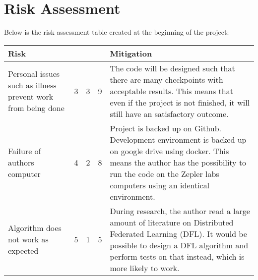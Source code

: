 \section{Risk Assessment}
Below is the risk assessment table created at the beginning of the project:
\begin{table}[H]
	\begin{tabular}{p{4cm}|l|l|l|p{10cm}}
		Risk    & \rotatebox{90}{Severity}  & \rotatebox{90}{Likelihood} & \rotatebox{90}{Score} & Mitigation \\
		\hline \hline
		Personal issues such as illness prevent work from being done & 3        & 3          & 9     & The code will be designed such that there are many checkpoints with acceptable results. This means that even if the project is not finished, it will still have an satisfactory outcome. \\
		\hline
		Failure of authors computer & 4        & 2          & 8     & Project is backed up on Github. Development environment is backed up on google drive using docker. This means the author has the possibility to run the code on the Zepler labs computers using an identical environment. \\
		\hline
		Algorithm does not work as expected & 5        & 1          & 5     & During research, the author read a large amount of literature on Distributed Federated Learning (DFL). It would be possible to design a DFL algorithm and perform tests on that instead, which is more likely to work.   
	\end{tabular}
\end{table}